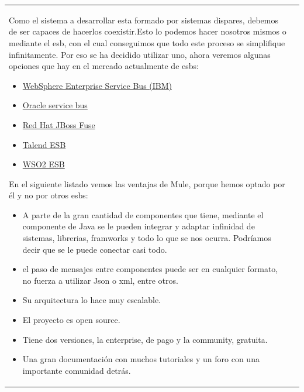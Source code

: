 \documentclass[a4paper]{article}
\begin{document}
\begin{center}
\begin{supertabular}{m{5.605cm}m{10.849cm}}
{      Como el sistema a desarrollar esta formado por sistemas dispares, debemos de ser capaces de hacerlos coexistir.Esto lo podemos hacer nosotros mismos o mediante el esb, con el cual conseguimos que todo este proceso se simplifique infinitamente. Por eso se ha decidido utilizar uno, ahora veremos algunas opciones que hay en el mercado actualmente de esbs:
      \begin{itemize}
      \item \href{https://www.ibm.com/support/knowledgecenter/en/SSQH9M_7.0.0/com.ibm.websphere.wesb.doc/doc/welcome_wps_ovw.html}{WebSphere Enterprise Service Bus (IBM)}
      \item \href{http://www.oracle.com/technetwork/middleware/service-bus/overview/index.html}{Oracle service bus}
      \item \href{https://developers.redhat.com/products/fuse/overview/}{Red Hat JBoss Fuse}
      \item \href{https://www.talend.com/products/application-integration/esb-open-studio/}{Talend ESB}
      \item \href{https://wso2.com/products/enterprise-service-bus/}{WSO2 ESB}
      \end{itemize}
      En el siguiente listado vemos las ventajas de Mule, porque hemos optado por él y no por otros esbs:
      \begin{itemize}
      \item A parte de la gran cantidad de componentes que tiene, mediante el componente de Java se le pueden integrar y adaptar infinidad de sistemas, librerias, framworks y todo lo que se nos ocurra. Podríamos decir que se le puede conectar casi todo.
      \item el paso de mensajes entre componentes puede ser en cualquier formato, no fuerza a utilizar Json o xml, entre otros.
      \item Su arquitectura lo hace muy escalable.
      \item El proyecto es open source.
      \item Tiene dos versiones, la enterprise, de pago y la community, gratuita.
      \item Una gran documentación con muchos tutoriales y un foro con una importante comunidad detrás.
      \end{itemize}
   	}\\
    

\end{supertabular}
\end{center}
\end{document}

